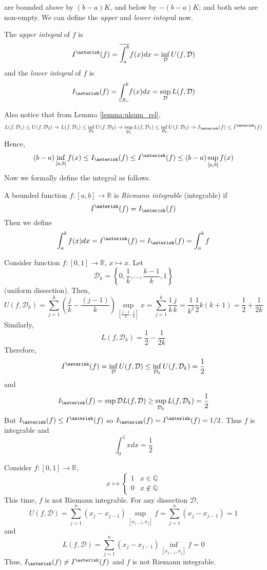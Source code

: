 \documentclass[10pt, a4paper, twoside]{report}
\begin{document}
are bounded above by \((b-a)K\), and below by \(-(b-a)K\); and both sets are non-empty. We can define the \emph{upper} and \emph{lower integra}l now.
\begin{definition}
    The \emph{upper integral} of \(f\) is 
    \[I^\asterisk(f)=\overline{\int_a^b}f(x)dx=\inf_{\mathcal{D}}U(f,\mathcal{D})\]
    and the \emph{lower integral} of \(f\) is 
    \[I_\asterisk(f)=\underline{\int_a^b}f(x)dx=\sup_{\mathcal{D}}L(f,\mathcal{D})\]
\end{definition}
Also notice that from Lemma \ref{lemma:ulsum_rel}, 
\[L(f,\mathcal{D}_1)\leq U(f,\mathcal{D}_2)\Rightarrow L(f,\mathcal{D}_1)\leq\inf_{\mathcal{D}_2}U(f,\mathcal{D}_2)\Rightarrow\sup_{\mathcal{D}_1}L(f,\mathcal{D}_1)\leq\inf_{\mathcal{D}_2}U(f,\mathcal{D}_2)\Rightarrow I_\asterisk(f)\leq I^\asterisk(f)\]
Hence,
\[(b-a)\inf_{[a,b]}f(x)\leq I_\asterisk(f)\leq I^\asterisk(f)\leq(b-a)\sup_{[a,b]}f(x)\]
Now we formally define the integral as follows.
\begin{definition}
    A bounded function \(f:[a,b]\to\mathbb{R}\) is \emph{Riemann integrable} (integrable) if 
    \[I^\asterisk(f)=I_\asterisk(f)\]
    Then we define 
    \[\int_a^bf(x)dx=I^\asterisk(f)=I_\asterisk(f)=\int_a^bf\]
\end{definition}
\begin{example}
    Consider function \(f:[0,1]\to\mathbb{R}\), \(x\mapsto x\). Let 
    \[\mathcal{D}_k=\left\{0,\frac 1k,\ldots,\frac{k-1}k,1\right\}\]
    (uniform dissection). Then,
    \[U(f,\mathcal{D}_k)=\sum_{j=1}^{k}\left(\frac jk-\frac{(j-1)}{k}\right)\sup_{\left[\frac{j-1}{k},\frac jk\right]}x=\sum_{j=1}^{k}\frac 1k\frac jk=\frac 1{k^2}\frac 12k(k+1)=\frac 12+\frac 1{2k}\]
    Similarly,
    \[L(f,\mathcal{D}_k)=\frac 12-\frac 1{2k}\]
    Therefore,
    \[I^\asterisk(f)=\inf_{\mathcal{D}}U(f,\mathcal{D})\leq\inf_{\mathcal{D}_k}U(f,\mathcal{D}_k)=\frac 12\]
    and 
    \[I_\asterisk(f)=\sup{\mathcal{D}}L(f,\mathcal{D})\geq\sup_{\mathcal{D}_k}L(f,\mathcal{D}_k)=\frac 12\]
    But \(I_\asterisk(f)\leq I^\asterisk(f)\) so \(I_\asterisk(f)= I^\asterisk(f)=1/2\). Thus \(f\) is integrable and 
    \[\int_0^1xdx=\frac 12\]
\end{example}
\begin{example}
    Consider \(f:[0,1]\to\mathbb{R}\), 
    \[x\mapsto\begin{cases}
        1 & x\in\mathbb{Q} \\
        0 & x\notin\mathbb{Q}
    \end{cases}\]
    This time, \(f\) is not Riemann integrable. For any dissection \(\mathcal{D}\),
    \[U(f,\mathcal{D})=\sum_{j=1}^{n}(x_j-x_{j-1})\sup_{[x_{j-1},x_j]}f=\sum_{j=1}^{n}(x_j-x_{j-1})=1\]
    and
    \[L(f,\mathcal{D})=\sum_{j=1}^{n}(x_j-x_{j-1})\inf_{[x_{j-1},x_j]}f=0\]
    Thus, \(I_\asterisk(f)\neq I^\asterisk(f)\) and \(f\) is not Riemann integrable.
\end{example}
\end{document}
